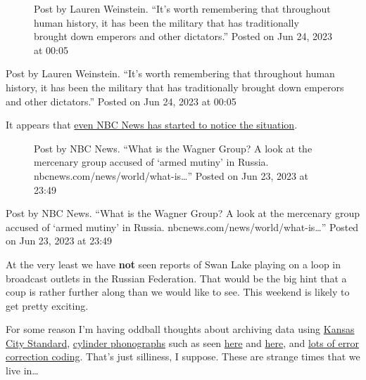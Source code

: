 \begin{figure}
\centering
{}
\caption{Post by Lauren Weinstein. ``It's worth remembering that
throughout human history, it has been the military that has
traditionally brought down emperors and other dictators.'' Posted on Jun
24, 2023 at 00:05}
\end{figure}

Post by Lauren Weinstein. ``It's worth remembering that throughout human
history, it has been the military that has traditionally brought down
emperors and other dictators.'' Posted on Jun 24, 2023 at 00:05

It appears that
\href{https://www.nbcnews.com/news/world/what-is-the-wagner-group-rcna90932}{even
NBC News has started to notice the situation}.

\begin{figure}
\centering
{}
\caption{Post by NBC News. ``What is the Wagner Group? A look at the
mercenary group accused of `armed mutiny' in Russia.
nbcnews.com/news/world/what-is\ldots{}'' Posted on Jun 23, 2023 at
23:49}
\end{figure}

Post by NBC News. ``What is the Wagner Group? A look at the mercenary
group accused of `armed mutiny' in Russia.
nbcnews.com/news/world/what-is\ldots{}'' Posted on Jun 23, 2023 at 23:49

At the very least we have \textbf{not} seen reports of Swan Lake playing
on a loop in broadcast outlets in the Russian Federation. That would be
the big hint that a coup is rather further along than we would like to
see. This weekend is likely to get pretty exciting.

For some reason I'm having oddball thoughts about archiving data using
\href{https://en.wikipedia.org/w/index.php?title=Kansas_City_standard&oldid=1140604070}{Kansas
City Standard},
\href{https://en.wikipedia.org/w/index.php?title=Phonograph_cylinder&oldid=1151598142}{cylinder
phonographs} such as seen
\href{http://web.archive.org/web/20210918113114/https://twitter.com/BL_DramaSound/status/867737576056258561}{here}
and
\href{http://web.archive.org/web/20230322183530/http://www.hellointernet.fm/podcast/2019/4/24/hi-122-wax-cylinders}{here},
and
\href{https://en.wikipedia.org/w/index.php?title=Error_correction_code&oldid=1158413565}{lots
of error correction coding}. That's just silliness, I suppose. These are
strange times that we live in\ldots{}
